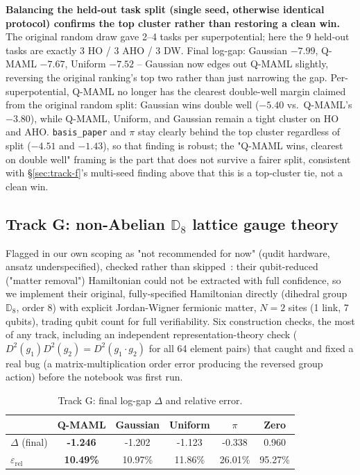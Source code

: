 \documentclass[11pt]{article}
\begin{document}
\begin{keyresult}
\textbf{Balancing the held-out task split (single seed, otherwise identical protocol) confirms the top
cluster rather than restoring a clean win.} The original random draw gave 2--4 tasks per superpotential;
here the 9 held-out tasks are exactly 3 HO / 3 AHO / 3 DW. Final log-gap: Gaussian $-7.99$, Q-MAML $-7.67$,
Uniform $-7.52$ -- Gaussian now edges out Q-MAML slightly, reversing the original ranking's top two rather
than just narrowing the gap. Per-superpotential, Q-MAML no longer has the clearest double-well margin
claimed from the original random split: Gaussian wins double well ($-5.40$ vs.\ Q-MAML's $-3.80$), while
Q-MAML, Uniform, and Gaussian remain a tight cluster on HO and AHO. \texttt{basis\_paper} and $\pi$ stay
clearly behind the top cluster regardless of split ($-4.51$ and $-1.43$), so that finding is robust; the
"Q-MAML wins, clearest on double well" framing is the part that does not survive a fairer split, consistent
with \S\ref{sec:track-f}'s multi-seed finding above that this is a top-cluster tie, not a clean win.
\end{keyresult}

\FloatBarrier
\subsection{Track G: non-Abelian $\mathbb{D}_8$ lattice gauge theory}
\label{sec:track-g}
Flagged in our own scoping as "not recommended for now" (qudit hardware, ansatz underspecified), checked
rather than skipped~\citep{d8lgt2025}: their qubit-reduced ("matter removal") Hamiltonian could not be
extracted with full confidence, so we implement their original, fully-specified Hamiltonian directly
(dihedral group $\mathbb{D}_8$, order 8) with explicit Jordan-Wigner fermionic matter, $N{=}2$ sites (1
link, 7 qubits), trading qubit count for full verifiability. Six construction checks, the most of any
track, including an independent representation-theory check
($D^2(g_1)D^2(g_2){=}D^2(g_1{\cdot}g_2)$ for all 64 element pairs) that caught and fixed a real bug (a
matrix-multiplication order error producing the reversed group action) before the notebook was first run.

\begin{table}[ht]
\centering
\caption{Track G: final log-gap $\Delta$ and relative error.}
\label{tab:d8lgt}
\begin{tabular}{lccccc}
\toprule
& Q-MAML & Gaussian & Uniform & $\pi$ & Zero \\
\midrule
$\Delta$ (final) & \textbf{-1.246} & -1.202 & -1.123 & -0.338 & 0.960 \\
$\varepsilon_{\mathrm{rel}}$ & \textbf{10.49\%} & 10.97\% & 11.86\% & 26.01\% & 95.27\% \\
\bottomrule
\end{tabular}
\end{table}
\end{document}
